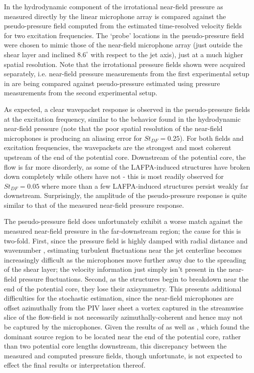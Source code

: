 In  the hydrodynamic component of the irrotational near-field pressure as measured directly by the linear microphone array is compared against the pseudo-pressure field computed from the estimated time-resolved velocity fields for two excitation frequencies. 
The `probe' locations in the pseudo-pressure field were chosen to mimic those of the near-field microphone array (just outside the shear layer and inclined $8.6^\circ$ with respect to the jet axis), just at a much higher spatial resolution.
Note that the irrotational pressure fields shown were acquired separately, i.e. near-field pressure measurements from the first experimental setup in  are being compared against pseudo-pressure estimated using pressure measurements from the second experimental setup. 

As expected, a clear wavepacket response is observed in the pseudo-pressure fields at the excitation frequency, similar to the behavior found in the hydrodynamic near-field pressure (note that the poor spatial resolution of the near-field microphones is producing an aliasing error for $St_{DF}=0.25$).
For both fields and excitation frequencies, the wavepackets are the strongest and most coherent upstream of the end of the potential core.
Downstream of the potential core, the flow is far more disorderly, as some of the LAFPA-induced structures have broken down completely while others have not - this is most readily observed for $St_{DF}=0.05$ where more than a few LAFPA-induced structures persist weakly far downstream.
Surprisingly, the amplitude of the pseudo-pressure response is quite similar to that of the measured near-field pressure response.

The pseudo-pressure field does unfortunately exhibit a worse match against the measured near-field pressure in the far-downstream region; the cause for this is two-fold.
First, since the pressure field is highly damped with radial distance and wavenumber \citep{Arndt1997}, estimating turbulent fluctuations near the jet centerline becomes increasingly difficult as the microphones move further away due to the spreading of the shear layer; the velocity information just simply isn't present in the near-field pressure fluctuations.
Second, as the structures begin to breakdown near the end of the potential core, they lose their axisymmetry.
This presents additional difficulties for the stochastic estimation, since the near-field microphones are offset azimuthally from the PIV laser sheet a vortex captured in the streamwise slice of the flow-field is not
necessarily azimuthally-coherent and hence may not be captured by the microphones.
Given the results of  as well as \citet{Hileman2005}, which found the dominant source region to be located near the end of the potential core, rather than two potential core lengths downstream, this discrepancy between the measured and computed pressure fields, though unfortunate, is not expected to effect the final results or interpretation thereof.  

